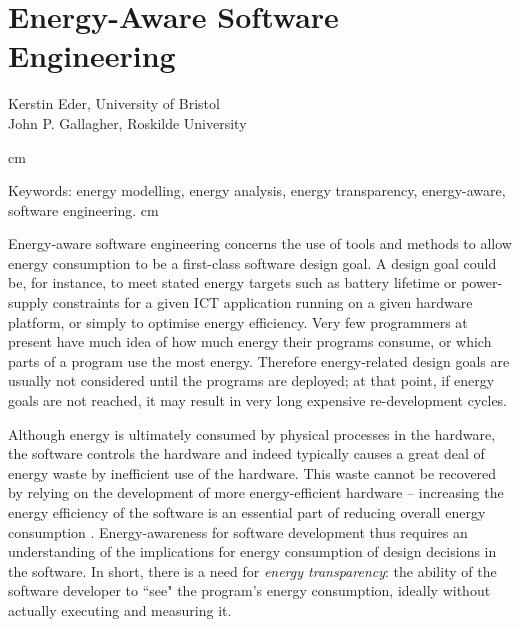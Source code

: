 \documentclass[oneside]{book}
\date{\today}
\begin{document}
\chapter{Energy-Aware Software Engineering}

\begin{center}
\textrm{Kerstin Eder,  University of Bristol\\John P. Gallagher, Roskilde University}
\end{center}
 cm

\noindent
\textrm{Keywords: energy modelling, energy analysis, energy transparency, energy-aware, software engineering.}
 cm

Energy-aware software engineering concerns the use of tools and methods to allow energy consumption to be a first-class software design goal. A design goal could be, for instance, to meet stated energy targets such as battery lifetime or power-supply constraints for a given ICT application running on a given hardware platform, or simply to optimise energy efficiency. Very few programmers at present have much idea of how much energy their programs consume, or which parts of a program use the most energy. Therefore energy-related design goals are usually not considered until the programs are deployed; at that point, if energy goals are not reached, it may result in very long expensive re-development cycles.


Although energy is ultimately consumed by physical processes in the hardware, the software controls the hardware and indeed typically causes a great deal of energy waste by inefficient use of the hardware. This waste cannot be recovered by relying on the development of more energy-efficient hardware -- increasing the energy efficiency of the software is an essential part of reducing overall energy consumption \cite{Furber2016}.  
 Energy-awareness for software development thus requires an understanding of the implications for energy consumption of design decisions in the software. In short, there is a need for \emph{energy transparency}: the ability of the software developer to ``see" the program's energy consumption, ideally without actually executing and measuring it. 
\end{document}
